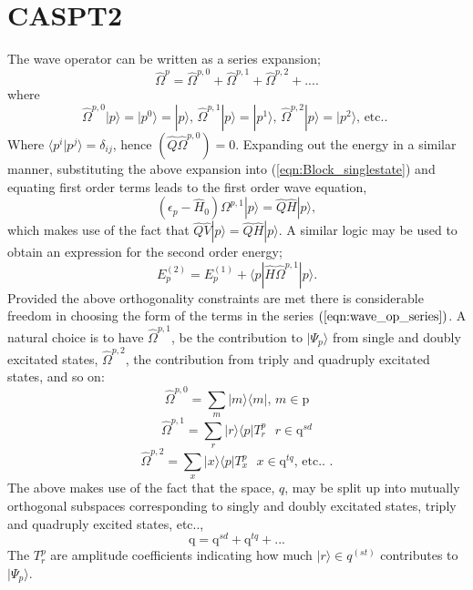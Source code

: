 \documentclass[12pt]{article}
\begin{document}
\section{ CASPT2 }
\noindent The wave operator can be written as a series expansion;
\begin{equation}
\hat{\Omega}^{p} = \hat{\Omega}^{p,0}+\hat{\Omega}^{p,1}+\hat{\Omega}^{p,2}+....
\end{equation} 
where 
\begin{equation}
\hat{\Omega}^{p,0}|p\rangle = |p^{0}\rangle = |p\rangle \text{, \ \  }
\hat{\Omega}^{p,1}|p\rangle = |p^{1}\rangle \text{, \ \ }
\hat{\Omega}^{p,2}|p\rangle = |p^{2}\rangle \text{, \  etc.. }
\label{eqn:wave_op_series}
\end{equation} 
Where  $\langle p^{i} | p^{j} \rangle=  \delta_{ij}$,  hence $(\hat{Q}\hat{\Omega}^{p,0}) = 0$.
Expanding out the energy in a similar manner,
substituting the above expansion into (\ref{eqn:Block_singlestate}) and equating first order terms leads to the first order
wave equation,
\begin{equation}
(\epsilon_{p} - \hat{H}_{0} )\Omega^{p,1}|p\rangle = \hat{Q}\hat{H}|p\rangle ,
\label{eqn:Bloch_singlestate_firstorder}
\end{equation}
which makes use of the fact that $ \hat{Q}\hat{V}|p\rangle= \hat{Q}\hat{H}|p\rangle$. A similar logic may be
used to obtain an expression for the second order energy;
\begin{equation}
E_{p}^{(2)} = E_{p}^{(1)} + \langle p | \hat{H} \hat{\Omega}^{p,1}| p \rangle .
\label{eqn:single_state_ptE_second_order}
\end{equation}
Provided the above orthogonality constraints are met there is considerable freedom in choosing the form of the terms in the
series $(\ref{eqn:wave_op_series})$.  A natural choice is to have $\hat{\Omega}^{p,1}$, be the contribution
to $|\Psi_{p}\rangle$ from single and doubly excitated states, $\hat{\Omega}^{p,2}$,  the contribution from triply
and quadruply excitated states, and so on:
\begin{equation*}
\hat{\Omega}^{p,0} = \sum_{m} |m \rangle \langle m |   \text{, \ \ \  } m \in \mathrm{p}
\end{equation*}
\begin{equation*}
\hat{\Omega}^{p,1} = \sum_{r}| r \rangle \langle p | T^{p}_{r} \text{ \ \ \ } r \in \mathrm{q}^{sd} 
\end{equation*}
\begin{equation*}
\hat{\Omega}^{p,2} = \sum_{x}| x \rangle \langle p | T^{p}_{x} \text{ \ \ \ } x \in \mathrm{q}^{tq}  \text{, \  etc.. }.
\end{equation*}
The above makes use of the fact that the space, $q$, may be split up into mutually orthogonal 
subspaces corresponding to singly and doubly excitated states, triply and quadruply excited states, etc..,
\begin{equation}
\mathrm{q} = \mathrm{q}^{sd} + \mathrm{q}^{tq} + ...
\end{equation}
The $T^{p}_{r}$ are amplitude coefficients indicating how much $|r\rangle \in q^{(st)}$
contributes to $|\Psi_{p}\rangle$.\\
\end{document}
